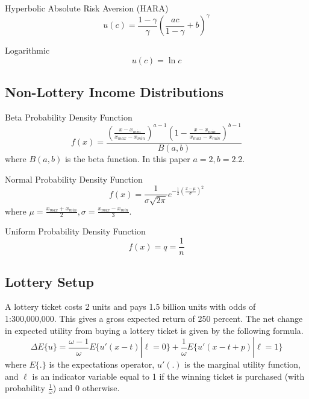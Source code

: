 \documentclass[letterpaper,12pt]{article}
\numberwithin{equation}{section}
\numberwithin{figure}{section}
\numberwithin{table}{section}
\begin{document}
\begin{spacing}{1.5}
		Hyperbolic Absolute Risk Aversion (HARA)
		\begin{equation}
			u(c) = \frac{1-\gamma}{\gamma} \left( \frac{a c}{1-\gamma} + b \right)^\gamma
		\end{equation}

		Logarithmic
		\begin{equation}
			u(c) = \ln c
		\end{equation}

	\subsection{Non-Lottery Income Distributions} \label{sec_dist}

		Beta Probability Density Function
		\begin{equation}
			f(x) = \frac{\left( \frac{x-x_{min}}{x_{max}-x_{min}} \right)^{a-1} \left(1 - \frac{x-x_{min}}{x_{max}-x_{min}} \right )^{b-1}} {B(a,b)}
		\end{equation}
		where $B(a,b)$ is the beta function.  In this paper $a=2, b=2.2$.

		Normal Probability Density Function
		\begin{equation}
			f(x) = \frac{1}{\sigma \sqrt{2 \pi}} e^{-\frac{1}{2} \left(\frac{x-\mu}{\sigma} \right)^2}
		\end{equation}
		where $\mu = \frac{x_{max}+x_{min}}{2}, \sigma = \frac{x_{max}-x_{min}}{3}$.

		Uniform Probability Density Function
		\begin{equation}
			f(x) = q = \frac{1}{n}
		\end{equation}	

	\subsection{Lottery Setup} \label{sec_lottery}

		A lottery ticket costs 2 units and pays 1.5 billion units with odds of 1:300,000,000.  This gives a gross expected return of 250 percent.  The net change in expected utility from buying a lottery ticket is given by the following formula.
		\begin{equation}
			\Delta E\{u\} = \frac{\omega - 1}{\omega} E\{u'(x - t)| \ell = 0 \} + \frac{1}{\omega} E\{u'(x - t + p)| \ell = 1 \}
		\end{equation}
		where $E\{.\}$ is the expectations operator, $u'(.)$ is the marginal utility function, and $\ell$ is an indicator variable equal to 1 if the winning ticket is purchased (with probability $\tfrac{1}{\omega}$) and 0 otherwise.


\end{spacing}
\end{document}
